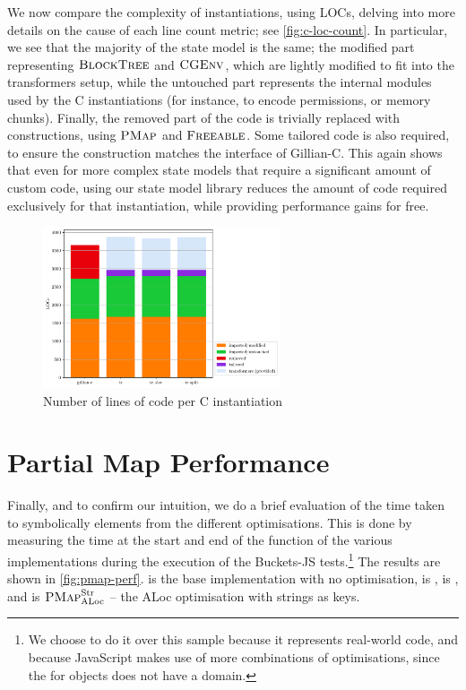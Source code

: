 We now compare the complexity of instantiations, using LOCs, delving into more details on the cause of each line count metric; see \autoref{fig:c-loc-count}. In particular, we see that the majority of the state model is the same; the modified part representing $\textsc{BlockTree}$ and $\textsc{CGEnv}$, which are lightly modified to fit into the transformers setup, while the untouched part represents the internal modules used by the C instantiations (for instance, to encode permissions, or memory chunks). Finally, the removed part of the code is trivially replaced with constructions, using $\textsc{PMap}$ and $\textsc{Freeable}$. Some tailored code is also required, to ensure the construction matches the interface of Gillian-C. This again shows that even for more complex state models that require a significant amount of custom code, using our state model library reduces the amount of code required exclusively for that instantiation, while providing performance gains for free.

\begin{figure}
	\centering
	\includegraphics[width=7cm]{figures/c/locs.pdf}
	\caption{Number of lines of code per C instantiation}
	\label{fig:c-loc-count}
\end{figure}

\section{Partial Map Performance} \label{sec:perf-pmap}

Finally, and to confirm our intuition, we do a brief evaluation of the time taken to symbolically  elements from the different \PMap{} optimisations. This is done by measuring the time at the start and end of the  function of the various \PMap{} implementations during the execution of the Buckets-JS tests.\footnote{We choose to do it over this sample because it represents real-world code, and because JavaScript makes use of more combinations of optimisations, since the \PMap{} for objects does not have a \Loc{} domain.} The results are shown in \autoref{fig:pmap-perf}.  is the base \PMap{} implementation with no optimisation,  is \SplitPMap,  is \ALocPMap, and  is $\textsc{PMap}_{\text{ALoc}}^{\text{Str}}$ -- the ALoc optimisation with strings as keys.

